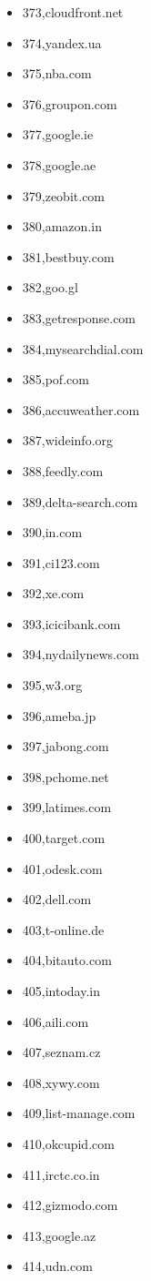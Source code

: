 \begin{multicols}{3}
\begin{itemize}
	\item 373,cloudfront.net
	\item 374,yandex.ua
	\item 375,nba.com
	\item 376,groupon.com
	\item 377,google.ie
	\item 378,google.ae
	\item 379,zeobit.com
	\item 380,amazon.in
	\item 381,bestbuy.com
	\item 382,goo.gl
	\item 383,getresponse.com
	\item 384,mysearchdial.com
	\item 385,pof.com
	\item 386,accuweather.com
	\item 387,wideinfo.org
	\item 388,feedly.com
	\item 389,delta-search.com
	\item 390,in.com
	\item 391,ci123.com
	\item 392,xe.com
	\item 393,icicibank.com
	\item 394,nydailynews.com
	\item 395,w3.org
	\item 396,ameba.jp
	\item 397,jabong.com
	\item 398,pchome.net
	\item 399,latimes.com
	\item 400,target.com
	\item 401,odesk.com
	\item 402,dell.com
	\item 403,t-online.de
	\item 404,bitauto.com
	\item 405,intoday.in
	\item 406,aili.com
	\item 407,seznam.cz
	\item 408,xywy.com
	\item 409,list-manage.com
	\item 410,okcupid.com
	\item 411,irctc.co.in
	\item 412,gizmodo.com
	\item 413,google.az
	\item 414,udn.com

\end{itemize}
\end{multicols}
